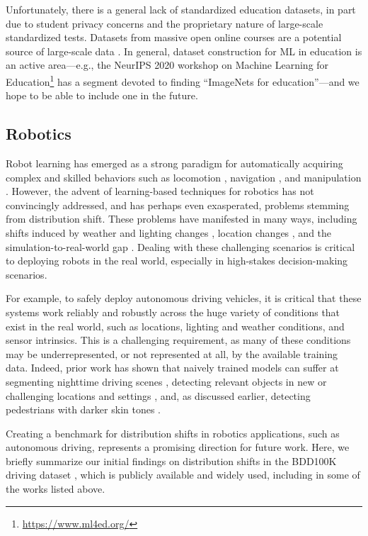 Unfortunately, there is a general lack of standardized education datasets, in part due to student privacy concerns and the proprietary nature of large-scale standardized tests.
Datasets from massive open online courses are a potential source of large-scale data \citep{kulkarni2015peer}.
In general, dataset construction for ML in education is an active area---e.g.,
the NeurIPS 2020 workshop on Machine Learning for Education\footnote{\url{https://www.ml4ed.org/}}
has a segment devoted to finding ``ImageNets for education''---and we hope to be able to include one in the future.


\subsection{Robotics}\label{sec:robotics}
Robot learning has emerged as a strong paradigm for automatically acquiring complex and skilled
behaviors such as locomotion \citep{yang19corl,peng20rss}, navigation \citep{mirowski17iclr,kahn20},
and manipulation \citep{gu17icra,openai19}. However, the advent of learning-based techniques for
robotics has not convincingly addressed, and has perhaps even exasperated, problems stemming from
distribution shift. These problems have manifested in many ways, including shifts induced by weather
and lighting changes \citep{wulfmeier18icra}, location changes \citep{gupta18nips}, and the
simulation-to-real-world gap \citep{sadeghi17rss,tobin17iros}.
Dealing with these challenging
scenarios is critical to deploying robots in the real world, especially in high-stakes
decision-making scenarios.

For example, to safely deploy autonomous driving vehicles, it is critical that these systems work
reliably and robustly across the huge variety of conditions that exist in the real world, such as
locations, lighting and weather conditions, and sensor intrinsics. This is a challenging
requirement, as many of these conditions may be underrepresented, or not represented at all, by the
available training data. Indeed, prior work has shown that naively trained models can suffer at
segmenting nighttime driving scenes \citep{dai18itsc}, detecting relevant objects in new or
challenging locations and settings \citep{yu20cvpr,sun20cvpr}, and, as discussed earlier, detecting
pedestrians with darker skin tones \citep{wilson2019predictive}.

Creating a benchmark for distribution shifts in robotics applications, such as autonomous driving,
represents a promising direction for future work. Here, we briefly summarize our initial findings on
distribution shifts in the BDD100K driving dataset \citep{yu20cvpr}, which is publicly available and
widely used, including in some of the works listed above.

